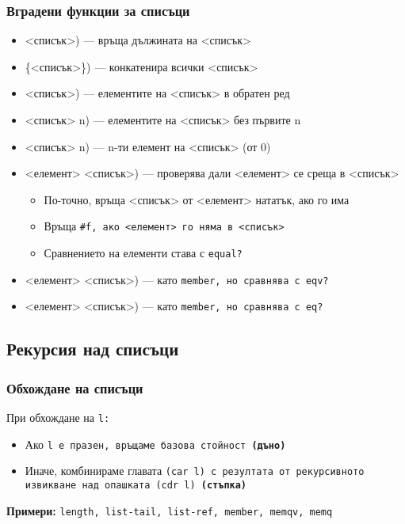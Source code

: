 \documentclass[alsotrans]{beamerswitch}
\begin{document}
\begin{frame}
  \frametitle{Вградени функции за списъци}
  \small
  \begin{itemize}[<+->]
  \item {} <списък>\tta) --- връща дължината на <списък>
  \item {} \{<списък>\}\tta) --- конкатенира всички <списък>
  \item {} <списък>\tta) --- елементите на <списък> в обратен ред
  \item {} <списък> n\tta) --- елементите на <списък> без първите n
  \item {} <списък> n\tta) --- n-ти елемент на <списък> (от 0)
  \item {} <елемент> <списък>\tta) --- проверява дали <елемент> се среща в <списък>
    \begin{itemize}
    \item По-точно, връща <списък> от <елемент> нататък, ако го има
    \item Връща \tt{\#f}, ако <елемент> го няма в <списък>
    \item Сравнението на елементи става с \tt{equal?}
    \end{itemize}
  \item {} <елемент> <списък>\tta) --- като \tt{member}, но сравнява с \tt{eqv?}
  \item {} <елемент> <списък>\tta) --- като \tt{member}, но сравнява с \tt{eq?}
  \end{itemize}
\end{frame}

\subsection{Рекурсия над списъци}

\begin{frame}
  \frametitle{Обхождане на списъци}

  При обхождане на \tt l:
  \begin{itemize}
  \item Ако \tt l е празен, връщаме базова стойност \textbf{(дъно)}
  \item Иначе, комбинираме главата \tt{(car l)} с резултата от рекурсивното извикване над опашката \tt{(cdr l)} \textbf{(стъпка)}
  \end{itemize}
  \pause
  \vspace{4ex}
  \textbf{Примери:} \tt{length}, \tt{list-tail}, \tt{list-ref}, \tt{member}, \tt{memqv}, \tt{memq}
\end{frame}
\end{document}
